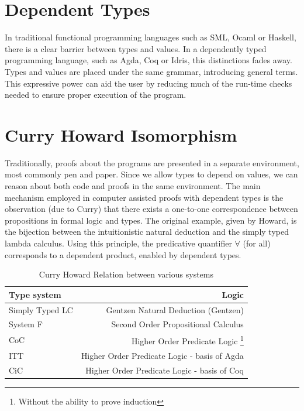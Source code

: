 \documentclass[12pt,twoside,notitlepage]{report}
\begin{document}
\section{Dependent Types} 

In traditional functional programming languages such as SML, Ocaml or Haskell, there is a clear barrier between types and values. In a dependently typed programming language, such as Agda, Coq or Idris, this distinctions fades away. Types and values are placed under the same grammar, introducing general terms. 
This expressive power can aid the user by reducing much of the run-time checks needed to ensure proper execution of the program. 

\section{Curry Howard Isomorphism}

Traditionally, proofs about the programs are presented in a separate environment, most commonly pen and paper. Since we allow types to depend on values, we can reason about both code and proofs in the same environment. 
The main mechanism employed in computer assisted proofs with dependent types is the observation (due to Curry) that there exists a one-to-one correspondence between propositions in formal logic and types. The original example, given by Howard, is the bijection between the intuitionistic natural deduction and the simply typed lambda calculus.
Using this principle, the predicative quantifier $\forall$ (for all) corresponds to a dependent product, enabled by dependent types.

\begin{table}[h!]
\centering 
	\begin{tabular}{l r} 
	\hline
	Type system & Logic \\
	\hline 
	Simply Typed LC  & Gentzen Natural Deduction (Gentzen) \\
	System F & Second Order Propositional Calculus \\
	CoC &  Higher Order Predicate Logic \footnote{Without the ability to prove induction} \\
	ITT & Higher Order Predicate Logic - basis of Agda \\ 
	CiC & Higher Order Predicate Logic - basis of Coq \\   
	\hline 
	\end{tabular}
\caption{Curry Howard Relation between various systems}
\end{table}
\end{document}
